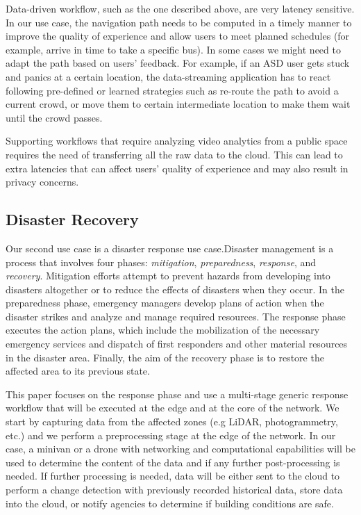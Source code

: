 Data-driven workflow, such as the one described above, are very latency sensitive. In our use case, the navigation path needs to be computed in a timely manner to improve the quality of experience and allow users to meet planned schedules (for example, arrive in time to take a specific bus). In some cases we might need to adapt the path based on users' feedback. For example, if an ASD user gets stuck and panics at a certain location, the data-streaming application has to react following pre-defined or learned strategies such as re-route the path to avoid a current crowd, or move them to certain intermediate location to make them wait until the crowd passes. 

Supporting workflows that require analyzing video analytics from a public space requires the need of transferring all the raw data to the cloud. This can lead to extra latencies that can affect users' quality of experience and may also result in privacy concerns.


\subsection{Disaster Recovery}

Our second use case is a disaster response use case.Disaster management is a process that involves four phases: \textit{mitigation}, \textit{preparedness}, \textit{response}, and \textit{recovery}. Mitigation efforts attempt to prevent hazards from developing into disasters altogether or to reduce the effects of disasters when they occur. In the preparedness phase, emergency managers develop plans of action when the disaster strikes and analyze and manage required resources. The response phase executes the action plans, which include the mobilization of the necessary emergency services and dispatch of first responders and other material resources in the disaster area. Finally, the aim of the recovery phase is to restore the affected area to its previous state.

This paper focuses on the response phase and use a multi-stage generic response workflow that will be executed at the edge and at the core of the network. We start by capturing data from the affected zones (e.g LiDAR, photogrammetry, etc.) and we perform a preprocessing stage at the edge of the network. In our case, a minivan or a drone with networking and computational capabilities will be used to determine the content of the data and if any further post-processing is needed. If further processing is needed, data will be either sent to the cloud to perform a change detection with previously recorded historical data, store data into the cloud, or notify agencies to determine if building conditions are safe. 

